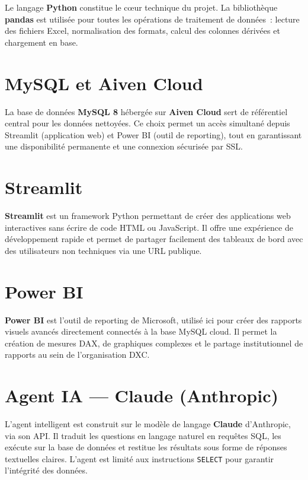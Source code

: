 \documentclass[12pt, a4paper]{report}
\begin{document}
Le langage \textbf{Python} constitue le cœur technique du projet. La bibliothèque \textbf{pandas} est utilisée pour toutes les opérations de traitement de données~: lecture des fichiers Excel, normalisation des formats, calcul des colonnes dérivées et chargement en base.

\section{MySQL et Aiven Cloud}

La base de données \textbf{MySQL 8} hébergée sur \textbf{Aiven Cloud} sert de référentiel central pour les données nettoyées. Ce choix permet un accès simultané depuis Streamlit (application web) et Power BI (outil de reporting), tout en garantissant une disponibilité permanente et une connexion sécurisée par SSL.

\section{Streamlit}

\textbf{Streamlit} est un framework Python permettant de créer des applications web interactives sans écrire de code HTML ou JavaScript. Il offre une expérience de développement rapide et permet de partager facilement des tableaux de bord avec des utilisateurs non techniques via une URL publique.

\section{Power BI}

\textbf{Power BI} est l'outil de reporting de Microsoft, utilisé ici pour créer des rapports visuels avancés directement connectés à la base MySQL cloud. Il permet la création de mesures DAX, de graphiques complexes et le partage institutionnel de rapports au sein de l'organisation DXC.

\section{Agent IA — Claude (Anthropic)}

L'agent intelligent est construit sur le modèle de langage \textbf{Claude} d'Anthropic, via son API. Il traduit les questions en langage naturel en requêtes SQL, les exécute sur la base de données et restitue les résultats sous forme de réponses textuelles claires. L'agent est limité aux instructions \texttt{SELECT} pour garantir l'intégrité des données.
\end{document}
